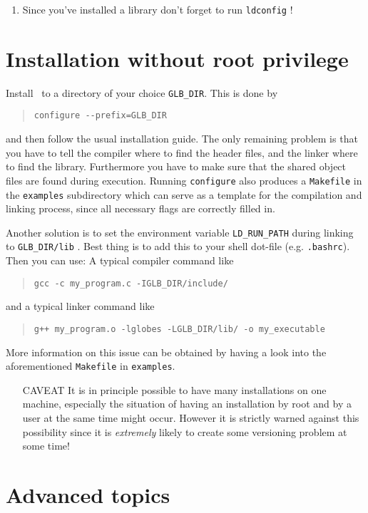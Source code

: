 \begin{appendix}
\begin{enumerate}
\item Since you've installed a library don't forget to run \verb+ldconfig+ !
\end{enumerate}
\section*{Installation without root privilege}

Install \GLOBES\ to a directory of your choice \verb+GLB_DIR+. This is done by
\begin{quote}
\verb+configure --prefix=GLB_DIR+
\end{quote}
and then follow the usual installation guide. The only remaining problem
is that you have to tell the compiler where to find the header files, and 
the linker where to find the library. Furthermore you have to make sure 
that the shared object files are found during execution. Running 
\verb+configure+
also produces a \verb+Makefile+ in the \verb+examples+ 
subdirectory which can serve as
a template for the compilation and linking process, since all necessary
flags are correctly filled in. 

Another solution is to set the environment variable \verb+LD_RUN_PATH+
during linking to \verb+GLB_DIR/lib+ . Best thing is to add this to your
shell dot-file (e.g. \verb+.bashrc+). Then you can use:
A typical compiler command like
\begin{quote}
\verb+gcc -c my_program.c -IGLB_DIR/include/+
\end{quote}
and a typical linker command like
\begin{quote}
\verb#g++ my_program.o -lglobes -LGLB_DIR/lib/ -o my_executable#
\end{quote}
More information on this issue can be obtained by having a look 
into the aforementioned  \verb+Makefile+ in \verb+examples+. 

\begin{itemize}
\item[CAVEAT] It is in principle possible to have many installations 
on one machine,
especially the situation of having an installation by root and by a user at
the same time might occur. However it is strictly warned against this 
possibility since it is \emph{extremely} likely to create some 
versioning problem at some time!
\end{itemize}

\section*{Advanced topics}


\end{appendix}
